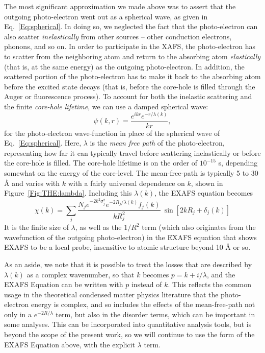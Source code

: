 The most significant approximation we made above was to assert that the
outgoing photo-electron went out as a spherical wave, as given in
Eq.~\ref{Eq:spherical}.  In doing so, we neglected the fact that the
photo-electron can also scatter {\emph{inelastically}} from other sources
-- other conduction electrons, phonons, and so on.  In order to participate
in the XAFS, the photo-electron has to scatter from the neighboring atom
and return to the absorbing atom {\emph{elastically}} (that is, at the same
energy) as the outgoing photo-electron.  In addition, the scattered portion
of the photo-electron has to make it back to the absorbing atom before the
excited state decays (that is, before the core-hole is filled through the
Auger or fluorescence process).  To account for both the inelastic
scattering and the finite {\emph{core-hole lifetime}}, we can use a damped
spherical wave:
\begin{equation}
  \psi(k,r) = {\frac{e^{ikr} e^{-r/\lambda(k)}}{kr}},
    \label{Eq:damped}
\end{equation}
\noindent
for the photo-electron wave-function in place of the spherical wave of
Eq.~\ref{Eq:spherical}.  Here, $\lambda$ is the {\emph{mean free path}} of
the photo-electron, representing how far it can typically travel before
scattering inelastically or before the core-hole is filled.  The core-hole
lifetime is on the order of $10^{-15}$ s, depending somewhat on the energy
of the core-level.  The mean-free-path is typically 5 to 30 {\AA} and
varies with $k$ with a fairly universal dependence on $k$, shown in
Figure~\ref{Fig:THE:lambda}.  Including this $\lambda(k)$, the EXAFS equation
becomes
\begin{equation}
  \chi(k) = \sum_j {
    {{ \frac{N_j e^{-2k^2\sigma_j^2} e^{-2R_j/\lambda(k)}  f_j(k)}{kR_j^2}}}\>
    \sin[2kR_j + \delta_j(k)] }
  \label{Eq:xafs4}
\end{equation}
\noindent
It is the finite size of $\lambda$, as well as the $1/R^2$ term (which also
originates from the wavefunction of the outgoing photo-electron) in the
EXAFS equation that shows EXAFS to be a local probe, insensitive to atomic
structure beyond 10 {\AA} or so.

As an aside, we note that it is possible to treat the losses that are
described by $\lambda(k)$ as a complex wavenumber, so that $k$ becomes $p =
k + i/\lambda$, and the EXAFS Equation can be written with $p$ instead of
$k$.  This reflects the common usage in the theoretical condensed matter
physics literature that the photo-electron energy is complex, and so
includes the effects of the mean-free-path not only in a $e^{-2R/\lambda}$
term, but also in the disorder terms, which can be important in some
analyses.  This can be incorporated into quantitative analysis tools, but
is beyond the scope of the present work, so we will continue to use the
form of the EXAFS Equation above, with the explicit $\lambda$ term.

